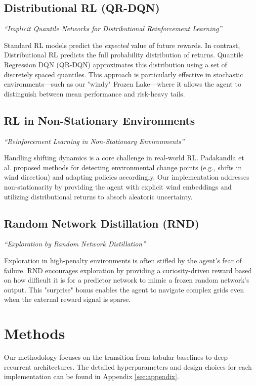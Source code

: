 \documentclass{article}
\begin{document}
\subsection{Distributional RL (QR-DQN)}
\textit{``Implicit Quantile Networks for Distributional Reinforcement Learning''} \cite{dabney2018}

Standard RL models predict the \textit{expected} value of future rewards. In contrast, Distributional RL predicts the full probability distribution of returns. Quantile Regression DQN (QR-DQN) approximates this distribution using a set of discretely spaced quantiles. This approach is particularly effective in stochastic environments—such as our "windy" Frozen Lake—where it allows the agent to distinguish between mean performance and risk-heavy tails.

\subsection{RL in Non-Stationary Environments}
\textit{``Reinforcement Learning in Non-Stationary Environments''} \cite{padakandla2022}

Handling shifting dynamics is a core challenge in real-world RL. Padakandla et al. proposed methods for detecting environmental change points (e.g., shifts in wind direction) and adapting policies accordingly. Our implementation addresses non-stationarity by providing the agent with explicit wind embeddings and utilizing distributional returns to absorb aleatoric uncertainty.

\subsection{Random Network Distillation (RND)}
\textit{``Exploration by Random Network Distillation''} \cite{burda2018}

Exploration in high-penalty environments is often stifled by the agent's fear of failure. RND encourages exploration by providing a curiosity-driven reward based on how difficult it is for a predictor network to mimic a frozen random network's output. This "surprise" bonus enables the agent to navigate complex grids even when the external reward signal is sparse.

\section{Methods}
Our methodology focuses on the transition from tabular baselines to deep recurrent architectures. The detailed hyperparameters and design choices for each implementation can be found in Appendix \ref{sec:appendix}.
\end{document}
